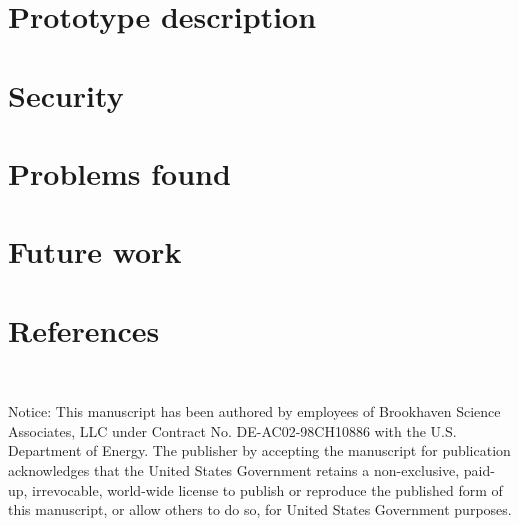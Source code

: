\documentclass[a4paper]{jpconf}
\begin{document}
\section{Prototype description}

\section{Security}

\section{Problems found}


\section{Future work}




\section*{References}{}




~

Notice:
This manuscript has been authored by employees of Brookhaven Science Associates,
LLC under Contract No. DE-AC02-98CH10886 with the U.S. Department of Energy.
The publisher by accepting the manuscript for publication acknowledges
that the United States Government retains a non-exclusive, paid-up, irrevocable,
world-wide license to publish or reproduce the published form of this manuscript,
or allow others to do so, for United States Government purposes.
\end{document}
